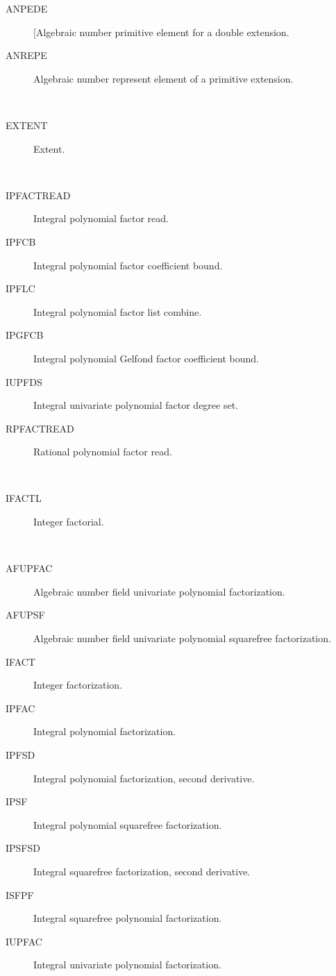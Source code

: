 \begin{description}
\begin{description}
  \item[ANPEDE]  [Algebraic number primitive element for a double extension.
  \item[ANREPE]  Algebraic number represent element of a primitive extension.
  \end{description}
\item[extent] \ \ 
  \begin{description}
  \item[EXTENT]  Extent.
  \end{description}
\item[factor] \ \ 
  \begin{description}
  \item[IPFACTREAD]  Integral polynomial factor read.
  \item[IPFCB]  Integral polynomial factor coefficient bound.
  \item[IPFLC]  Integral polynomial factor list combine.
  \item[IPGFCB]  Integral polynomial Gelfond factor coefficient bound.
  \item[IUPFDS]  Integral univariate polynomial factor degree set.
  \item[RPFACTREAD]  Rational polynomial factor read.
  \end{description}
\item[factorial] \ \ 
  \begin{description}
  \item[IFACTL]  Integer factorial.
  \end{description}
\item[factorization] \ \ 
  \begin{description}
  \item[AFUPFAC]  Algebraic number field univariate polynomial factorization.
  \item[AFUPSF]  Algebraic number field univariate polynomial squarefree
    factorization.
  \item[IFACT]  Integer factorization.
  \item[IPFAC]  Integral polynomial factorization.
  \item[IPFSD]  Integral polynomial factorization, second derivative.
  \item[IPSF]  Integral polynomial squarefree factorization.
  \item[IPSFSD]  Integral squarefree factorization, second derivative.
  \item[ISFPF]  Integral squarefree polynomial factorization.
  \item[IUPFAC]  Integral univariate polynomial factorization.

\end{description}
\end{description}
